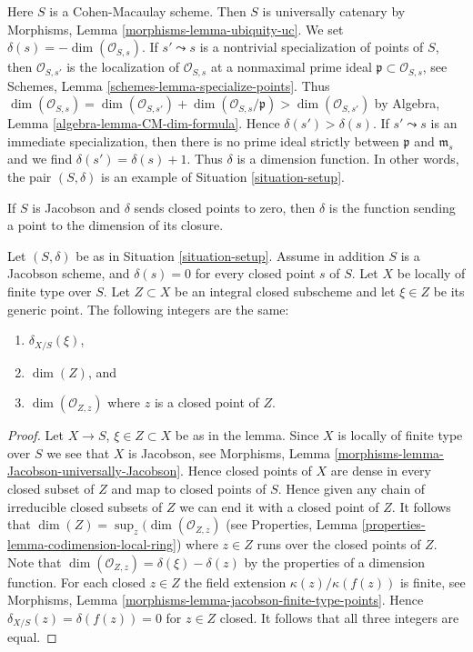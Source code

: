 \begin{example}
\label{example-CM-irreducible}
Here $S$ is a Cohen-Macaulay scheme. Then $S$ is universally catenary by
Morphisms, Lemma \ref{morphisms-lemma-ubiquity-uc}.
We set $\delta(s) = -\dim(\mathcal{O}_{S, s})$.
If $s' \leadsto s$ is a nontrivial specialization of points of $S$,
then $\mathcal{O}_{S, s'}$ is the localization of $\mathcal{O}_{S, s}$
at a nonmaximal prime ideal $\mathfrak p \subset \mathcal{O}_{S, s}$, see
Schemes, Lemma \ref{schemes-lemma-specialize-points}.
Thus $\dim(\mathcal{O}_{S, s}) =
\dim(\mathcal{O}_{S, s'}) + \dim(\mathcal{O}_{S, s}/\mathfrak p) >
\dim(\mathcal{O}_{S, s'})$ by
Algebra, Lemma \ref{algebra-lemma-CM-dim-formula}.
Hence $\delta(s') > \delta(s)$. If $s' \leadsto s$ is
an immediate specialization, then there is no prime
ideal strictly between $\mathfrak p$ and $\mathfrak m_s$
and we find $\delta(s') = \delta(s) + 1$. Thus $\delta$
is a dimension function. In other words, the pair $(S, \delta)$
is an example of Situation \ref{situation-setup}.
\end{example}

\noindent
If $S$ is Jacobson and $\delta$ sends closed points to zero, then $\delta$
is the function sending a point to the dimension of its closure.

\begin{lemma}
\label{lemma-delta-is-dimension}
Let $(S, \delta)$ be as in Situation \ref{situation-setup}.
Assume in addition $S$ is a Jacobson scheme, and $\delta(s) = 0$ for every
closed point $s$ of $S$. Let $X$ be locally of finite type over $S$.
Let $Z \subset X$ be an integral closed subscheme and let
$\xi \in Z$ be its generic point. The following integers are the same:
\begin{enumerate}
\item $\delta_{X/S}(\xi)$,
\item $\dim(Z)$, and
\item $\dim(\mathcal{O}_{Z, z})$ where $z$ is a closed point of $Z$.
\end{enumerate}
\end{lemma}

\begin{proof}
Let $X \to S$, $\xi \in Z \subset X$ be as in the lemma.
Since $X$ is locally of finite type over $S$ we see that
$X$ is Jacobson, see
Morphisms, Lemma \ref{morphisms-lemma-Jacobson-universally-Jacobson}.
Hence closed points of $X$ are dense in every closed subset of $Z$
and map to closed points of $S$. Hence given any chain
of irreducible closed subsets of $Z$ we can end it with a closed point of $Z$.
It follows that $\dim(Z) = \sup_z(\dim(\mathcal{O}_{Z, z})$
(see Properties, Lemma \ref{properties-lemma-codimension-local-ring})
where $z \in Z$ runs over the closed points of $Z$.
Note that $\dim(\mathcal{O}_{Z, z}) = \delta(\xi) - \delta(z)$
by the properties of a dimension function.
For each closed $z \in Z$ the field extension
$\kappa(z)/\kappa(f(z))$ is finite, see Morphisms,
Lemma \ref{morphisms-lemma-jacobson-finite-type-points}.
Hence $\delta_{X/S}(z) = \delta(f(z)) = 0$ for $z \in Z$ closed.
It follows that all three integers are equal.
\end{proof}

